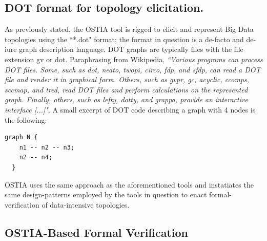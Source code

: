 \documentclass[smallextended]{svjour3}       %
\newcommand{\comment}[1]{{\textbf{\color{red}[#1]}}}
\begin{document}
\subsection{DOT format for topology elicitation.}

{\color{blue}
As previously stated, the OSTIA tool is rigged to elicit and represent Big Data topologies using the ``*.dot" format; the format in question is a de-facto and de-iure graph description language. DOT graphs are typically files with the file extension gv or dot. Paraphrasing from Wikipedia, \emph{``Various programs can process DOT files. Some, such as dot, neato, twopi, circo, fdp, and sfdp, can read a DOT file and render it in graphical form. Others, such as gvpr, gc, acyclic, ccomps, sccmap, and tred, read DOT files and perform calculations on the represented graph. Finally, others, such as lefty, dotty, and grappa, provide an interactive interface [...]"}. 
A small excerpt of DOT code describing a graph with 4 nodes is the following:

\begin{lstlisting}[basicstyle=\normalfont\ttfamily\small,tabsize=12,caption=DOT script describing an undirected graph N with four nodes.]
  graph N {
  	n1 -- n2 -- n3;
 	n2 -- n4;
  } 
\end{lstlisting}
OSTIA uses the same approach as the aforementioned tools and instatiates the same design-patterns employed by the tools in question to enact formal-verification of data-intensive topologies.
}
%
\subsection{OSTIA-Based Formal Verification}\label{ver}\label{verification}
%

\newcommand{\M}{\mathcal{M}}
\newcommand{\timestr}{\mathcal{T}}

\newcommand{\D}{\mathcal{D}}
\newcommand{\C}{\mathcal{C}}

\newcommand{\U}{\mathbf{U}}
\newcommand{\Snc}{\mathbf{S}}
\newcommand{\T}{\mathbf{T}}
\newcommand{\R}{\mathbf{R}}

\newcommand{\Nat}{\mathbb{N}}
\newcommand{\Z}{\mathbb{Z}}
\newcommand{\Real}{\mathbb{R}}
\newcommand{\Q}{\mathbb{Q}}


\newcommand{\X}[1]{\mathbf{X}\left(#1\right)}
\newcommand{\Y}[1]{\mathbf{Y}\left(#1\right)}
\end{document}
